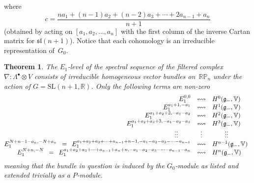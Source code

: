 \documentclass[11pt]{article}
\newtheorem{theorem}{Theorem}
\begin{document}
where
\[c=\frac{na_1+(n-1)a_2+(n-2)a_3+\cdots+2a_{n-1}+a_n}{n+1}\]
(obtained by acting on $[a_1,a_2,\dots,a_n]$ with the f\/irst column of the
inverse Cartan matrix for ${\mathfrak{sl}}(n+1)$). Notice that each cohomology
is an irreducible representation of~$G_0$.

\begin{theorem}\label{E1level}
The $E_1$-level of the spectral sequence of the filtered complex
$\nabla:\Lambda^\bullet\otimes V$ consists of irreducible homogeneous vector
bundles on~${\mathbb{RP}}_n$ under the action of
$G={\mathrm{SL}}(n+1,{\mathbb{R}})$. Only the following terms are non-zero
\[\begin{array}{@{}rcl}
E_1^{0,0}&\leftrightsquigarrow&H^0({\mathfrak{g}}_-,{\mathbb{V}})\\
E_1^{a_1+1,-a_1}&\leftrightsquigarrow&H^1({\mathfrak{g}}_-,{\mathbb{V}})\\
E_1^{a_1+a_2+2,-a_1-a_2}&\leftrightsquigarrow&
H^2({\mathfrak{g}}_-,{\mathbb{V}})\\
E_1^{a_1+a_2+a_3+3,-a_1-a_2-a_3}&\leftrightsquigarrow&
H^3({\mathfrak{g}}_-,{\mathbb{V}})\\
\vdots\vdots\hspace*{20pt}&\vdots&\hspace*{20pt}\vdots\vdots\\
E_1^{N+n-1-a_n,-N+a_n}\enskip=\enskip
E_1^{a_1+a_2+a_3+\cdots+a_{n-1}+n-1,-a_1-a_2-a_3-\cdots-a_{n-1}}
&\leftrightsquigarrow&
H^{n-1}({\mathfrak{g}}_-,{\mathbb{V}})\\
E_1^{N+n,-N}\enskip=\enskip
E_1^{a_1+a_2+a_3+\cdots+a_{n-1}+a_n+n,-a_1-a_2-a_3-\cdots-a_{n-1}-a_n}
&\leftrightsquigarrow&
H^n({\mathfrak{g}}_-,{\mathbb{V}})
\end{array}\]
meaning that the bundle in question is induced by the $G_0$-module as listed
and extended trivially as a $P$-module.
\end{theorem}
\end{document}
